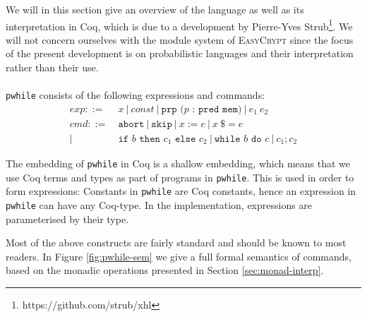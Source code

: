 \documentclass[11pt, leqno, titlepage]{article}
\theoremstyle{definition}
\begin{document}
We will in this section give an overview of the language as well as its
interpretation in Coq, which is due to a development by Pierre-Yves
Strub\footnote{https://github.com/strub/xhl}. We will not concern ourselves with the
module system of \textsc{EasyCrypt} since the focus of the present development is on
probabilistic languages and their interpretation rather than their use.\\
\\
\texttt{pwhile} consists of the following expressions and commands: 
\begin{align*}
  exp ::=~& x ~\vert ~ const ~\vert ~ \texttt{prp ($p$ : pred mem)}~\vert ~ e_1\ e_2\\
  cmd ::=~& \texttt{abort} ~\vert ~ \texttt{skip} ~\vert ~ x := e ~\vert ~ x\ \$= e\\
  \vert ~ & \texttt{if } b \texttt{ then } c_1 \texttt{ else } c_2 ~\vert ~
            \texttt{while } b \texttt{ do } c ~\vert ~ c_1 ; c_2
\end{align*}

The embedding of \texttt{pwhile} in Coq is a shallow embedding, which means that we
use Coq terms and types as part of programs in \texttt{pwhile}. This is used in order
to form expressions: Constants in \texttt{pwhile} are Coq constants, hence an
expression in \texttt{pwhile} can have any Coq-type. In the implementation,
expressions are parameterised by their type.

Most of the above constructs are fairly standard and should be known to most
readers. In Figure \ref{fig:pwhile-sem} we give a full formal semantics of commands,
based on the monadic operations presented in Section \ref{sec:monad-interp}.
\end{document}
